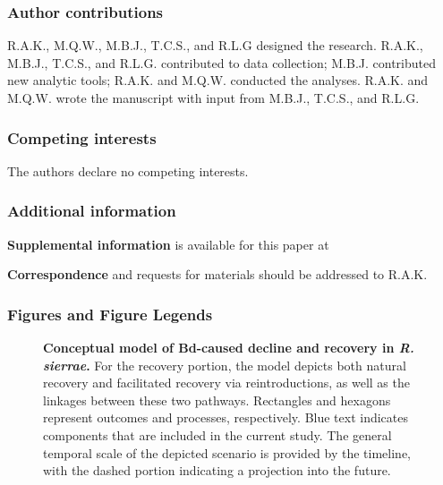 \documentclass[
  letterpaper,
  DIV=11,
  numbers=noendperiod]{scrartcl}
\begin{document}
\subsubsection{Author contributions}\label{author-contributions}

R.A.K., M.Q.W., M.B.J., T.C.S., and R.L.G designed the research. R.A.K.,
M.B.J., T.C.S., and R.L.G. contributed to data collection; M.B.J.
contributed new analytic tools; R.A.K. and M.Q.W. conducted the
analyses. R.A.K. and M.Q.W. wrote the manuscript with input from M.B.J.,
T.C.S., and R.L.G.

\subsubsection{\texorpdfstring{\textbf{Competing
interests}}{Competing interests}}\label{competing-interests}

The authors declare no competing interests.

\subsubsection{Additional information}\label{additional-information}

\textbf{Supplemental information} is available for this paper at

\textbf{Correspondence} and requests for materials should be addressed
to R.A.K.

\newpage

\subsubsection{Figures and Figure
Legends}\label{figures-and-figure-legends}

\begin{figure}


\caption{\label{fig-recovery-model}\textbf{Conceptual model of Bd-caused
decline and recovery in \emph{R. sierrae}.} For the recovery portion,
the model depicts both natural recovery and facilitated recovery via
reintroductions, as well as the linkages between these two pathways.
Rectangles and hexagons represent outcomes and processes, respectively.
Blue text indicates components that are included in the current study.
The general temporal scale of the depicted scenario is provided by the
timeline, with the dashed portion indicating a projection into the
future.}

\end{figure}%
\end{document}
